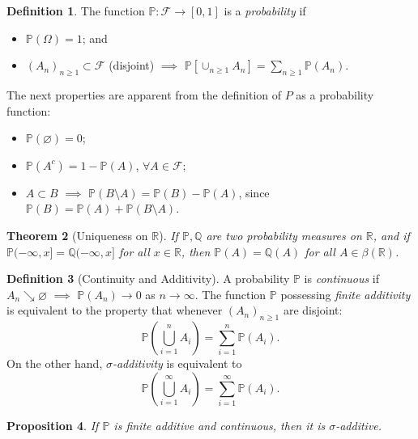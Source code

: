 \documentclass[12pt,reqno]{article}
\renewcommand{\emph}[1]{\textit{#1}}
\theoremstyle{plain}
\newtheorem{theorem}{Theorem}[section]
\newtheorem{prop}[theorem]{Proposition}
\theoremstyle{definition}
\newtheorem{definition}[theorem]{Definition}
\begin{document}
\begin{definition} 
The function $\mathbb{P}: \mathcal{F} \rightarrow [0,1]$ is a 
\emph{probability} if 
\begin{itemize} 

\item $\mathbb{P}(\Omega) = 1$; and 
\item $(A_n)_{n \geq 1} \subset \mathcal{F}$ (disjoint) $\implies$ 
     $\mathbb{P}\left[\cup_{n \geq 1} A_n\right] = \sum_{n \geq 1} 
     \mathbb{P}(A_n)$. 

\end{itemize} 
\end{definition} 
The next properties are apparent from the definition of $P$ as a 
probability function:
\begin{itemize} 

\item $\mathbb{P}(\varnothing) = 0$; 
\item $\mathbb{P}(A^c) = 1 - \mathbb{P}(A)$, $\forall A \in \mathcal{F}$; 
\item $A \subset B$ $\implies$ $\mathbb{P}(B \setminus A) = 
     \mathbb{P}(B) - \mathbb{P}(A)$, since 
     $\mathbb{P}(B) = \mathbb{P}(A) + \mathbb{P}(B \setminus A)$. 

\end{itemize} 

\begin{theorem}[Uniqueness on $\mathbb{R}$]
If $\mathbb{P},\mathbb{Q}$ are two probability measures on $\mathbb{R}$, 
and if $\mathbb{P}(-\infty,x] = \mathbb{Q}(-\infty,x]$ for all 
$x \in \mathbb{R}$, then $\mathbb{P}(A) = \mathbb{Q}(A)$ for all 
$A \in \beta(\mathbb{R})$. 
\end{theorem} 

\begin{definition}[Continuity and Additivity]
A probability $\mathbb{P}$ is \emph{continuous} if 
$A_n \searrow \varnothing$ $\implies$ $\mathbb{P}(A_n) \rightarrow 0$ as 
$n \rightarrow \infty$. The function $\mathbb{P}$ possessing 
\emph{finite additivity} is equivalent to the property that whenever 
$(A_n)_{n \geq 1}$ are disjoint:
\[
\mathbb{P}\left(\bigcup_{i=1}^n A_i\right) = \sum_{i=1}^n \mathbb{P}(A_i). 
\]
On the other hand, \emph{$\sigma$-additivity} is equivalent to 
\[
\mathbb{P}\left(\bigcup_{i=1}^{\infty} A_i\right) = 
     \sum_{i=1}^{\infty} \mathbb{P}(A_i). 
\]
\end{definition} 

\begin{prop}
If $\mathbb{P}$ is finite additive and continuous, then it is 
$\sigma$-additive. 
\end{prop} 
\end{document}

